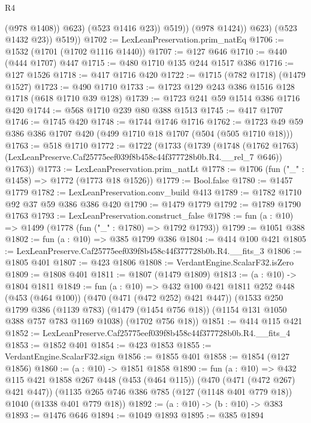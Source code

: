 \begin{lexlean}{R4}
\begin{coremodule}
                        (@978 @1408))
                      @623)
                    (@523 @1416 @23))
                  @519))
              (@978 @1424))
            @623)
          (@523 @1432 @23))
        @519))
@1702 := LexLeanPreservation.prim_natEq
@1706 := @1532 (@1701 (@1702 @1116 @1440))
@1707 := @127 @646
@1710 := @440 (@444 @1707) @447
@1715 := @480 @1710 @135 @244 @1517 @386
@1716 := @127 @1526
@1718 := @417 @1716 @420
@1722 := @1715 (@782 @1718) (@1479 @1527)
@1723 := @490 @1710
@1733 := @1723 @129 @243 @386 @1516 @128 @1718 (@618 @1710 @39 @128)
@1739 := @1723 @241 @59 @1514 @386 @1716 @420
@1744 := @568 @1710 @239 @80 @388 @1513
@1745 := @417 @1707
@1746 := @1745 @420
@1748 := @1744 @1746 @1716
@1762 := @1723 @49 @59 @386 @386 @1707 @420 (@499 @1710 @18 @1707 (@504 (@505 @1710 @18)))
@1763 := @518 @1710
@1772 := @1722
    (@1733
      (@1739
        (@1748 (@1762 @1763) (LexLeanPreserve.Caf25775eef039f8b458c44f377728b0b.R4.__rel_7 @646))
        @1763))
@1773 := LexLeanPreservation.prim_natLt
@1778 := @1706 (fun ("_" : @1458) => @1772 (@1773 @18 @1526))
@1779 := Bool.false
@1780 := @1457 @1779
@1782 := LexLeanPreservation.conv_build @413
@1789 := @1782 @1710 @92 @37 @59 @386 @386 @420
@1790 := @1479 @1779
@1792 := @1789 @1790 @1763
@1793 := LexLeanPreservation.construct_false
@1798 := fun (a : @10) => @1499 (@1778 (fun ("_" : @1780) => @1792 @1793))
@1799 := @1051 @388
@1802 := fun (a : @10) => @385 @1799 @386
@1804 := @414 @100 @421
@1805 := LexLeanPreserve.Caf25775eef039f8b458c44f377728b0b.R4.__fits_3
@1806 := @1805 @401
@1807 := @423 @1806
@1808 := VerdantEngine.ScalarF32.isZero
@1809 := @1808 @401
@1811 := @1807 (@1479 @1809)
@1813 := (a : @10) -> @1804 @1811
@1849 := fun (a : @10) =>
  @432
    @100
    @421
    @1811
    @252
    @448
    (@453 (@464 @100))
    (@470 (@471 (@472 @252) @421 @447))
    (@1533
      @250
      @1799
      @386
      (@1139 @783)
      (@1479 (@1454 @756 @18))
      (@1154 @131 @1050 @388 @757 @783 @1169 @1038)
      (@1702 @756 @18))
@1851 := @414 @115 @421
@1852 := LexLeanPreserve.Caf25775eef039f8b458c44f377728b0b.R4.__fits_4
@1853 := @1852 @401
@1854 := @423 @1853
@1855 := VerdantEngine.ScalarF32.sign
@1856 := @1855 @401
@1858 := @1854 (@127 @1856)
@1860 := (a : @10) -> @1851 @1858
@1890 := fun (a : @10) =>
  @432
    @115
    @421
    @1858
    @267
    @448
    (@453 (@464 @115))
    (@470 (@471 (@472 @267) @421 @447))
    (@1135 @265 @746 @386 @785 (@127 (@1148 @401 @779 @18)) @1040 (@1338 @401 @779 @18))
@1892 := (a : @10) -> (b : @10) -> @383
@1893 := @1476 @646
@1894 := @1049 @1893
@1895 := @385 @1894

\end{coremodule}
\end{lexlean}
